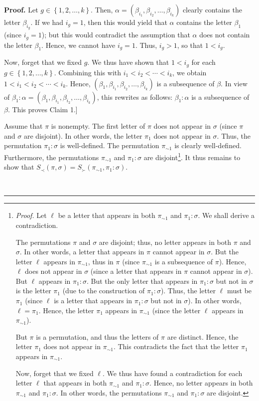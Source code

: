 \documentclass[numbers=enddot,12pt,final,onecolumn,notitlepage]{scrartcl}%
\theoremstyle{definition}
\newenvironment{proof}[1][Proof]{\noindent\textbf{#1.} }{\ \rule{0.5em}{0.5em}}
\newenvironment{verlong}{}{}
\begin{document}
\begin{verlong}
\begin{proof}
Let $g\in\left\{  1,2,\ldots,k\right\}  $. Then, $\alpha=\left(  \beta_{i_{1}%
},\beta_{i_{2}},\ldots,\beta_{i_{k}}\right)  $ clearly contains the letter
$\beta_{i_{g}}$. If we had $i_{g}=1$, then this would yield that $\alpha$
contains the letter $\beta_{1}$ (since $i_{g}=1$); but this would contradict
the assumption that $\alpha$ does not contain the letter $\beta_{1}$. Hence,
we cannot have $i_{g}=1$. Thus, $i_{g}>1$, so that $1<i_{g}$.

Now, forget that we fixed $g$. We thus have shown that $1<i_{g}$ for each
$g\in\left\{  1,2,\ldots,k\right\}  $. Combining this with $i_{1}<i_{2}%
<\cdots<i_{k}$, we obtain $1<i_{1}<i_{2}<\cdots<i_{k}$. Hence, $\left(
\beta_{1},\beta_{i_{1}},\beta_{i_{2}},\ldots,\beta_{i_{k}}\right)  $ is a
subsequence of $\beta$. In view of $\beta_{1}:\alpha=\left(  \beta_{1}%
,\beta_{i_{1}},\beta_{i_{2}},\ldots,\beta_{i_{k}}\right)  $, this rewrites as
follows: $\beta_{1}:\alpha$ is a subsequence of $\beta$. This proves Claim 1.]

Assume that $\pi$ is nonempty. The first letter of $\pi$ does not appear in
$\sigma$ (since $\pi$ and $\sigma$ are disjoint). In other words, the letter
$\pi_{1}$ does not appear in $\sigma$. Thus, the permutation $\pi_{1}:\sigma$
is well-defined. The permutation $\pi_{\sim1}$ is clearly well-defined.
Furthermore, the permutations $\pi_{\sim1}$ and $\pi_{1}:\sigma$ are
disjoint\footnote{\textit{Proof.} Let $\ell$ be a letter that appears in both
$\pi_{\sim1}$ and $\pi_{1}:\sigma$. We shall derive a contradiction.
\par
The permutations $\pi$ and $\sigma$ are disjoint; thus, no letter appears in
both $\pi$ and $\sigma$. In other words, a letter that appears in $\pi$ cannot
appear in $\sigma$. But the letter $\ell$ appears in $\pi_{\sim1}$, thus in
$\pi$ (since $\pi_{\sim1}$ is a subsequence of $\pi$). Hence, $\ell$ does not
appear in $\sigma$ (since a letter that appears in $\pi$ cannot appear in
$\sigma$). But $\ell$ appears in $\pi_{1}:\sigma$. But the only letter that
appears in $\pi_{1}:\sigma$ but not in $\sigma$ is the letter $\pi_{1}$ (due
to the construction of $\pi_{1}:\sigma$). Thus, the letter $\ell$ must be
$\pi_{1}$ (since $\ell$ is a letter that appears in $\pi_{1}:\sigma$ but not
in $\sigma$). In other words, $\ell=\pi_{1}$. Hence, the letter $\pi_{1}$
appears in $\pi_{\sim1}$ (since the letter $\ell$ appears in $\pi_{\sim1}$).
\par
But $\pi$ is a permutation, and thus the letters of $\pi$ are distinct. Hence,
the letter $\pi_{1}$ does not appear in $\pi_{\sim1}$. This contradicts the
fact that the letter $\pi_{1}$ appears in $\pi_{\sim1}$.
\par
Now, forget that we fixed $\ell$. We thus have found a contradiction for each
letter $\ell$ that appears in both $\pi_{\sim1}$ and $\pi_{1}:\sigma$. Hence,
no letter appears in both $\pi_{\sim1}$ and $\pi_{1}:\sigma$. In other words,
the permutations $\pi_{\sim1}$ and $\pi_{1}:\sigma$ are disjoint.}. It thus
remains to show that $S_{\prec}\left(  \pi,\sigma\right)  =S_{\succ}\left(
\pi_{\sim1},\pi_{1}:\sigma\right)  $.


\end{proof}
\end{verlong}
\end{document}

